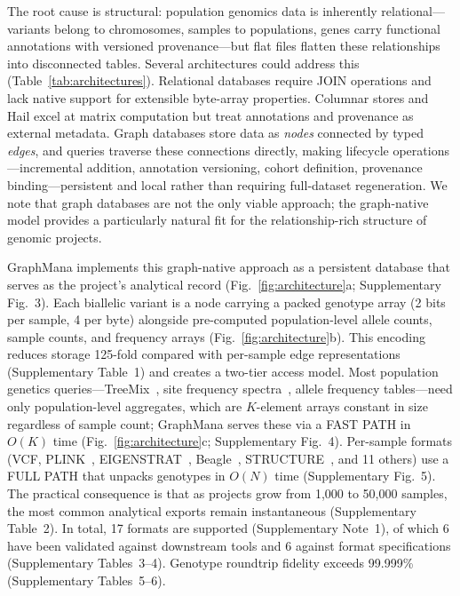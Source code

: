 \documentclass[pdflatex,sn-nature]{sn-jnl}
\begin{document}
The root cause is structural: population genomics data is inherently relational---variants belong to chromosomes, samples to populations, genes carry functional annotations with versioned provenance---but flat files flatten these relationships into disconnected tables. Several architectures could address this (Table~\ref{tab:architectures}). Relational databases require JOIN operations and lack native support for extensible byte-array properties. Columnar stores and Hail excel at matrix computation but treat annotations and provenance as external metadata. Graph databases store data as \textit{nodes} connected by typed \textit{edges}, and queries traverse these connections directly, making lifecycle operations---incremental addition, annotation versioning, cohort definition, provenance binding---persistent and local rather than requiring full-dataset regeneration. We note that graph databases are not the only viable approach; the graph-native model provides a particularly natural fit for the relationship-rich structure of genomic projects.

GraphMana implements this graph-native approach as a persistent database that serves as the project's analytical record (Fig.~\ref{fig:architecture}a; Supplementary Fig.~3). Each biallelic variant is a node carrying a packed genotype array (2 bits per sample, 4 per byte) alongside pre-computed population-level allele counts, sample counts, and frequency arrays (Fig.~\ref{fig:architecture}b). This encoding reduces storage 125-fold compared with per-sample edge representations (Supplementary Table~1) and creates a two-tier access model. Most population genetics queries---TreeMix~\cite{pickrell2012treemix}, site frequency spectra~\cite{gutenkunst2009dadi,excoffier2021fsc}, allele frequency tables---need only population-level aggregates, which are $K$-element arrays constant in size regardless of sample count; GraphMana serves these via a FAST PATH in $O(K)$ time (Fig.~\ref{fig:architecture}c; Supplementary Fig.~4). Per-sample formats (VCF, PLINK~\cite{chang2015plink}, EIGENSTRAT~\cite{patterson2006eigenstrat}, Beagle~\cite{browning2007beagle}, STRUCTURE~\cite{pritchard2000structure}, and 11 others) use a FULL PATH that unpacks genotypes in $O(N)$ time (Supplementary Fig.~5). The practical consequence is that as projects grow from 1,000 to 50,000 samples, the most common analytical exports remain instantaneous (Supplementary Table~2). In total, 17 formats are supported (Supplementary Note~1), of which 6 have been validated against downstream tools and 6 against format specifications (Supplementary Tables~3--4). Genotype roundtrip fidelity exceeds 99.999\% (Supplementary Tables~5--6).
\end{document}
